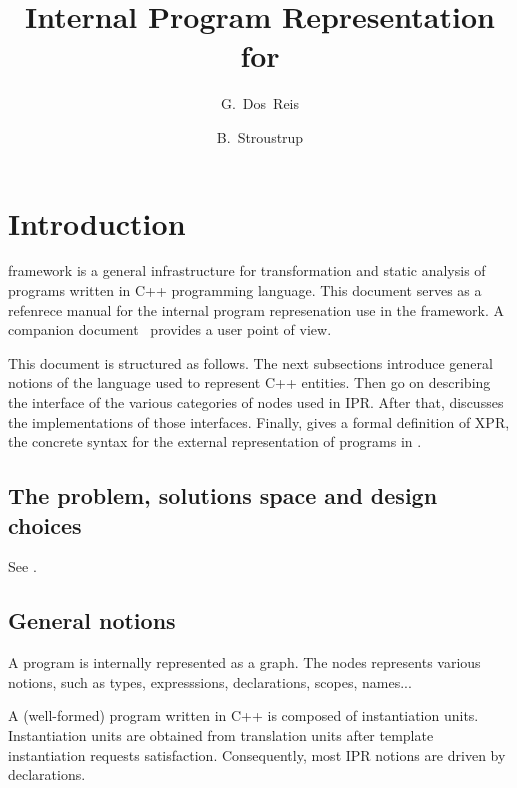 \documentclass[letter,11pt]{article}
\title{Internal Program Representation for \ThePivot}
\author{G.~Dos~Reis \and B.~Stroustrup}
\date{}
\begin{document}
\maketitle

\section{Introduction}
\label{sec:intro}

\ThePivot{} framework is a general infrastructure for transformation and
static analysis of programs written in C++ programming language. This document
serves as a refenrece manual for the internal program represenation use in the 
\ThePivot{} framework.  A companion 
document~\cite{dosreis04:ipr-user-guide} provides a user point of view.


This document is structured as follows. The next subsections introduce general
notions of the language used to represent C++ entities. 
 Then  go on describing the
interface of the various categories of nodes used in IPR. After that,
 discusses the implementations of those interfaces.  Finally,
 gives a formal definition of XPR, the concrete syntax
for the external representation of programs in \ThePivot{}.


\subsection{The problem, solutions space and design choices}
\label{sec:design}

See \cite{stroustrup02:xti, gdr-bs05:cxx-rep}.

\subsection{General notions}
\label{sec:intro:general-notion}

A program is internally represented as a graph.  The nodes represents various
notions, such as types, expresssions, declarations, scopes, names...

A (well-formed) program written in C++ is composed of instantiation units. 
Instantiation units are obtained from translation units after template
instantiation requests satisfaction.  Consequently, most IPR notions are
driven by declarations.
\end{document}
